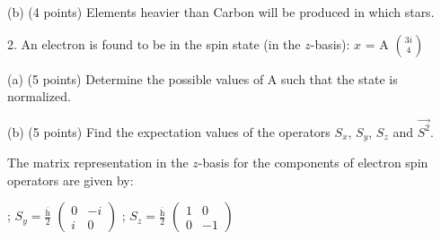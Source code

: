 \documentclass{article}
\begin{document}
\vspace{8pt}

\hspace{0.7cm} (b) (4 points) Elements heavier than Carbon will be produced in which stars. \\

\vspace{12pt}

2. An electron is found to be in the spin state (in the $z$-basis): $x$ = A {\LARGE \(\binom{3i}{4}\)} \\

\vspace{6pt}

\hspace{0.7cm} (a) (5 points) Determine the possible values of A such that the state is normalized. \\

\vspace{12pt}

\hspace{0.7cm} (b) (5 points) Find the expectation values of the operators {\color{red} $S_{x}$}, {\color{purple} $S_{y}$}, {\color{orange} $S_{z}$} and $\Vec{S^2}$. \\

\vspace{12pt}

\hspace{0.5cm} The matrix representation in the $z$-basis for the components of electron spin operators are given by: 

\vspace{12pt}

 ; {\color{purple} \hspace{0.9cm} $S_{y} = $$\frac{\overline{\mbox{h}}}{2}$ 
 $\begin{pmatrix}
     0 & -i \\
     i & 0 
 \end{pmatrix}$} ; {\color{orange} \hspace{0.9cm} $S_{z} = $$\frac{\overline{\mbox{h}}}{2}$ 
 $\begin{pmatrix}
     1 & 0 \\
     0 & -1 
 \end{pmatrix}$} \\
\end{document}
